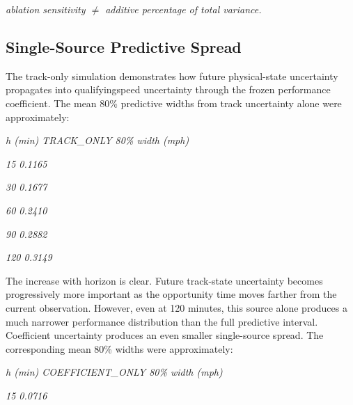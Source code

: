 \begin{center}\textit{ablation sensitivity \ensuremath{\neq} additive percentage of total variance.}\end{center}

\subsection{Single-Source Predictive Spread}
The track-only simulation demonstrates how future physical-state uncertainty propagates into qualifyingspeed uncertainty through the frozen performance coefficient. The mean 80\% predictive widths from track uncertainty alone were approximately:

\begin{center}\textit{h (min)    TRACK\_ONLY 80\% width (mph)}\end{center}

\begin{center}\textit{15                0.1165}\end{center}

\begin{center}\textit{30                0.1677}\end{center}

\begin{center}\textit{60                0.2410}\end{center}

\begin{center}\textit{90                0.2882}\end{center}

\begin{center}\textit{120                0.3149}\end{center}

The increase with horizon is clear. Future track-state uncertainty becomes progressively more important as the opportunity time moves farther from the current observation. However, even at 120 minutes, this source alone produces a much narrower performance distribution than the full predictive interval. Coefficient uncertainty produces an even smaller single-source spread. The corresponding mean 80\% widths were approximately:

\begin{center}\textit{h (min)     COEFFICIENT\_ONLY 80\% width (mph)}\end{center}

\begin{center}\textit{15                    0.0716}\end{center}

